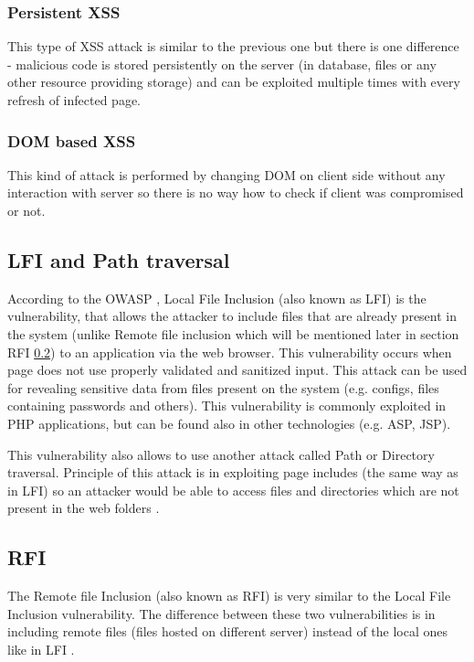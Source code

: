 			\subsubsection{Persistent XSS}
			This type of XSS attack is similar to the previous one but there is one difference - malicious code is stored persistently on the server (in database, files or any other resource providing storage) and can be exploited multiple times with every refresh of infected page.
		
			\subsubsection{DOM based XSS}
			This kind of attack is performed by changing DOM on client side without any interaction with server so there is no way how to check if client was compromised or not.

		\subsection{LFI and Path traversal}
		
		According to the OWASP \cite{LFI}, Local File Inclusion (also known as LFI) is the vulnerability, that allows the attacker to include files that are already present in the system (unlike Remote file inclusion which will be mentioned later in section RFI \ref{RFI}) to an application via the web browser. This vulnerability occurs when page does not use properly validated and sanitized input. This attack can be used for revealing sensitive data from files present on the system (e.g. configs, files containing passwords and others). This vulnerability is commonly exploited in PHP applications, but can be found also in other technologies (e.g. ASP, JSP).
		
		This vulnerability also allows to use another attack called Path or Directory traversal. Principle of this attack is in exploiting page includes (the same way as in LFI) so an attacker would be able to access files and directories which are not present in the web folders \cite{Path-traversal}.
		
		\subsection{RFI}\label{RFI}
		
		The Remote file Inclusion (also known as RFI) is very similar to the Local File Inclusion vulnerability. The difference between these two vulnerabilities is in including remote files (files hosted on different server) instead of the local ones like in LFI \cite{RFI}.
		
